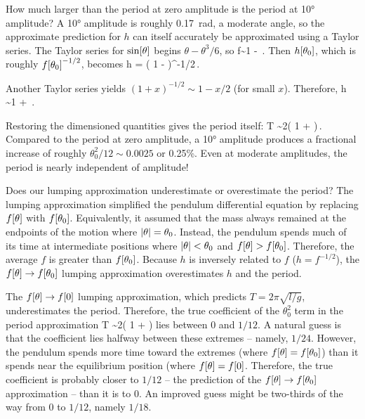 How much larger than the period at zero amplitude is the period at \ang{10} amplitude? A \ang{10} amplitude is roughly \SI{0.17}{rad}, a moderate angle, so the approximate prediction for $h$ can itself accurately be approximated using a Taylor series. The Taylor series for $\sin\!\left[{\theta}\right]$ begins $\theta - \theta^3/6$, so
\beq
f\sim 1 - \,.
\eeq
Then $h\!\left[{\theta_0}\right]$, which is roughly $f\!\left[{\theta_0}\right]^{-1/2}$, becomes
\beq
h = \left( 1 -  \right)^{-1/2}\,.
\eeq

Another Taylor series yields $(1 + x)^{-1/2}\sim 1 - x/2$ (for small $x$). Therefore,
\beq
h \sim 1 + \,.
\eeq

Restoring the dimensioned quantities gives the period itself:
\beq
T \sim 2\pi {}\left( 1 + \right)\,.
\eeq
Compared to the period at zero amplitude, a \ang{10} amplitude produces a fractional increase of roughly $\theta_0^2/12\sim 0.0025$ or 0.25\%. Even at moderate amplitudes, the period is nearly independent of amplitude!

Does our lumping approximation underestimate or overestimate the period? The lumping approximation simplified the pendulum differential equation by replacing $f\!\left[{\theta}\right]$ with $f\!\left[{\theta_0}\right]$. Equivalently, it assumed that the mass always remained at the endpoints of the motion where $\lvert{\theta}\rvert = \theta_0$. Instead, the pendulum spends much of its time at intermediate positions where $\lvert{\theta}\rvert < \theta_0$ and $f\!\left[{\theta}\right] > f\!\left[{\theta_0}\right]$. Therefore, the average $f$ is greater than $f\!\left[{\theta_0}\right]$. Because $h$ is inversely related to $f$ ($h = f^{-1/2}$), the $f\!\left[{\theta}\right]\to f\!\left[{\theta_0}\right]$ lumping approximation overestimates $h$ and the period.

The $f\!\left[{\theta}\right]\to f\!\left[{0}\right]$ lumping approximation, which predicts $T = 2\pi\sqrt{l/g}$, underestimates the period. Therefore, the true coefficient of the $\theta_0^2$ term in the period approximation
\beq
T \sim 2\pi {}\left( 1 + \right)
\eeq
lies between 0 and $1/12$. A natural guess is that the coefficient lies halfway between these extremes -- namely, $1/24$. However, the pendulum spends more time toward the extremes (where $f\!\left[{\theta}\right] = f\!\left[{\theta_0}\right]$) than it spends near the equilibrium position (where $f\!\left[{\theta}\right] = f\!\left[{0}\right]$. Therefore, the true coefficient is probably closer to $1/12$ -- the prediction of the $f\!\left[{\theta}\right]\to f\!\left[{\theta_0}\right]$ approximation -- than it is to 0. An improved guess might be two-thirds of the way from 0 to $1/12$, namely $1/18$.

